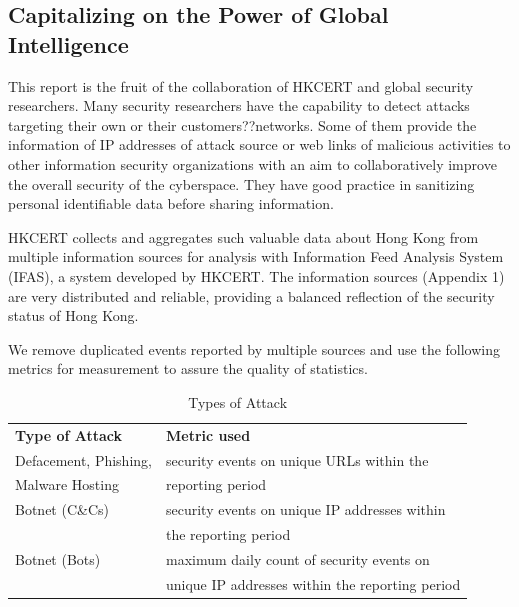 \documentclass[11pt]{article}
\begin{document}
\subsection*{Capitalizing on the Power of Global Intelligence}

This report is the fruit of the collaboration of HKCERT and global security researchers. Many security researchers have the capability to detect attacks targeting their own or their customers??networks. Some of them provide the information of IP addresses of attack source or web links of malicious activities to other information security organizations with an aim to collaboratively improve the overall security of the cyberspace. They have good practice in sanitizing personal identifiable data before sharing information.

HKCERT collects and aggregates such valuable data about Hong Kong from multiple information sources for analysis with Information Feed Analysis System (IFAS), a system developed by HKCERT. The information sources (Appendix 1) are very distributed and reliable, providing a balanced reflection of the security status of Hong Kong.

We remove duplicated events reported by multiple sources and use the following metrics for measurement to assure the quality of statistics.

\begin{table}[b]
\centering
\caption{Types of Attack}
\begin{tabular}{ll}
\hline
\textbf{ Type of Attack}              & \textbf{ Metric used}                                                                         \\\hhline{==}
Defacement, Phishing,                 & security events on unique URLs within the             \\
Malware Hosting                       & reporting period\\\hline
Botnet (C\&Cs)                        & security events on unique IP addresses within    \\
                                      & the reporting period \\\hline
Botnet (Bots)                         & maximum daily count of security events on  \\
                                      & unique IP addresses within the reporting period \\\hline
\end{tabular}

\end{table}
\end{document}
